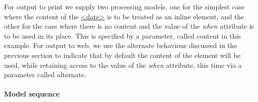 For output to print we supply two processing models, one for the simplest case where the content of the \hyperref[TEI.date]{<date>} is to be treated as an inline element, and the other for the case where there is no content and the value of the {\itshape when} attribute is to be used in its place. This is specified by a parameter, called \textsf{content} in this example. For output to web, we use the \textsf{alternate} behaviour discussed in the previous section to indicate that by default the content of the element will be used, while retaining access to the value of the {\itshape when} attribute, this time via a parameter called \textsf{alternate}.
\paragraph[{Model sequence}]{Model sequence}\label{TDPMMS}\par
